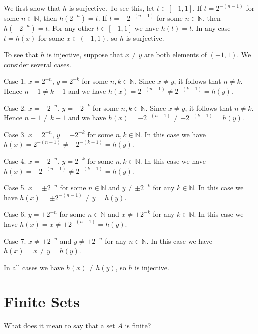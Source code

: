 \begin{example}
We first show that $h$ is surjective.  To see this, let $t\in[-1,1]$. If $t=2^{-(n-1)}$ for some $n\in\mathbb N$, then $h(2^{-n})=t$. If $t=-2^{-(n-1)}$ for some $n\in\mathbb N$, then $h(-2^{-n})=t$. For any other $t\in[-1,1]$ we have $h(t)=t$.  In any case $t=h(x)$ for some $x\in(-1,1)$, so $h$ is surjective.

To see that $h$ is injective, suppose that $x\neq y$ are both elements of $(-1,1)$.  We consider several cases.

\smallbreak\noindent
{\rm Case 1. $x=2^{-n}$, $y=2^{-k}$ for some $n,k\in\mathbb N$.\/} Since $x\neq y$, it follows that $n\neq k$.  Hence $n-1\neq k-1$ and we have $h(x)=2^{-(n-1)}\neq 2^{-(k-1)}=h(y)$.

\smallbreak\noindent
{\rm Case 2. $x=-2^{-n}$, $y=-2^{-k}$ for some $n,k\in\mathbb N$.\/} Since $x\neq y$, it follows that $n\neq k$.  Hence $n-1\neq k-1$ and we have $h(x)=-2^{-(n-1)}\neq -2^{-(k-1)}=h(y)$.

\smallbreak\noindent
{\rm Case 3. $x=2^{-n}$, $y=-2^{-k}$ for some $n,k\in\mathbb N$.\/} In this case we have $h(x)=2^{-(n-1)}\neq -2^{-(k-1)}=h(y)$.

\smallbreak\noindent
{\rm Case 4. $x=-2^{-n}$, $y=2^{-k}$ for some $n,k\in\mathbb N$.\/} In this case we have $h(x)=-2^{-(n-1)}\neq 2^{-(k-1)}=h(y)$.

\smallbreak\noindent
{\rm Case 5. $x=\pm 2^{-n}$ for some $n\in\mathbb N$ and $y\neq \pm 2^{-k}$ for any $k\in\mathbb N$.\/} In this case we have $h(x)=\pm 2^{-(n-1)}\neq y=h(y)$.

\smallbreak\noindent
{\rm Case 6. $y=\pm 2^{-n}$ for some $n\in\mathbb N$ and $x\neq \pm 2^{-k}$ for any $k\in\mathbb N$.\/} In this case we have $h(x)=x\neq \pm 2^{-(n-1)}=h(y)$.

\smallbreak\noindent
{\rm Case 7. $x\neq\pm 2^{-n}$ and $y\neq \pm 2^{-n}$ for any $n\in\mathbb N$.\/} In this case we have $h(x)=x\neq y=h(y)$.

\smallbreak
In all cases we have $h(x)\neq h(y)$, so $h$ is injective.
\end{example}

\section{Finite Sets}

\begin{question*}
What does it mean to say that a set $A$ is finite?
\end{question*}

